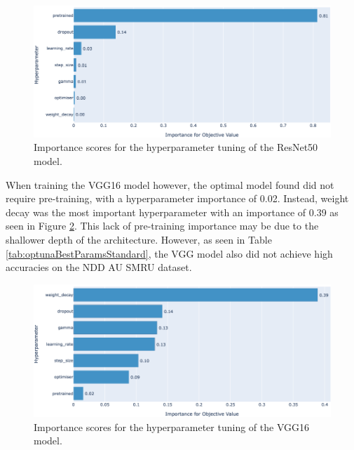 \begin{figure}
	\begin{center}
		\includegraphics[scale=0.4]{Chapter6/figs/resnet50baseline-hyperparam-importance-optuna-updated.png}
	\end{center}
	\caption{Importance scores for the hyperparameter tuning of the ResNet50 model.}
	\label{fig:resnet50baseline-hyperparam-importance-optuna}
\end{figure}

When training the VGG16 model however, the optimal model found did not require pre-training, with a hyperparameter importance of 0.02. Instead, weight decay was the most important hyperparameter with an importance of 0.39 as seen in Figure \ref{fig:vgg16baseline-hyperparam-importance-optuna}. This lack of pre-training importance may be due to the shallower depth of the architecture. However, as seen in Table \ref{tab:optunaBestParamsStandard}, the VGG model also did not achieve high accuracies on the NDD AU SMRU dataset. 

\begin{figure}
	\begin{center}
		\includegraphics[scale=0.4]{Chapter6/figs/vgg16-baseline-hyperparam-importance-optuna-updated.png}
	\end{center}
	\caption{Importance scores for the hyperparameter tuning of the VGG16 model.}
	\label{fig:vgg16baseline-hyperparam-importance-optuna}
\end{figure}


